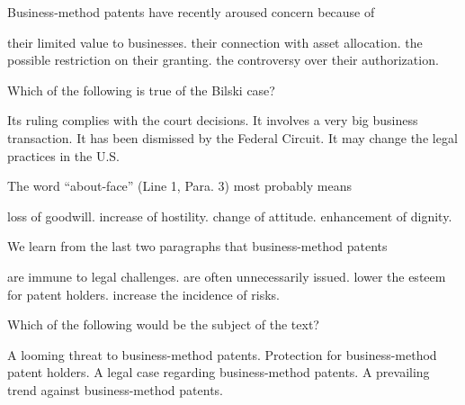 \item Business-method patents have recently aroused concern because of
\begin{tasks}
	\task their limited value to businesses.
	\task their connection with asset allocation.
	\task the possible restriction on their granting.
	\task the controversy over their authorization.
\end{tasks}
\item Which of the following is true of the Bilski case?
\begin{tasks}
	\task Its ruling complies with the court decisions.
	\task It involves a very big business transaction.
	\task It has been dismissed by the Federal Circuit.
	\task It may change the legal practices in the U.S.
\end{tasks}
\item The word ``about-face'' (Line 1, Para. 3) most probably means
\begin{tasks}
	\task loss of goodwill.
	\task increase of hostility.
	\task change of attitude.
	\task enhancement of dignity.
\end{tasks}
\item We learn from the last two paragraphs that business-method patents
\begin{tasks}
	\task are immune to legal challenges.
	\task are often unnecessarily issued.
	\task lower the esteem for patent holders.
	\task increase the incidence of risks.
\end{tasks}
\item Which of the following would be the subject of the text?
\begin{tasks}
	\task A looming threat to business-method patents.
	\task Protection for business-method patent holders.
	\task A legal case regarding business-method patents.
	\task A prevailing trend against business-method patents.
\end{tasks}